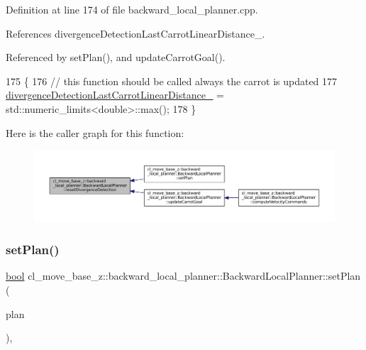 Definition at line 174 of file backward\+\_\+local\+\_\+planner.\+cpp.



References divergence\+Detection\+Last\+Carrot\+Linear\+Distance\+\_\+.



Referenced by set\+Plan(), and update\+Carrot\+Goal().


\begin{DoxyCode}
175         \{
176             \textcolor{comment}{// this function should be called always the carrot is updated}
177             \hyperlink{classcl__move__base__z_1_1backward__local__planner_1_1BackwardLocalPlanner_a3187b3b0c9a640133556efd056f2e736}{divergenceDetectionLastCarrotLinearDistance\_} = 
      std::numeric\_limits<double>::max();
178         \}
\end{DoxyCode}
Here is the caller graph for this function\+:
\nopagebreak
\begin{figure}[H]
\begin{center}
\leavevmode
\includegraphics[width=350pt]{classcl__move__base__z_1_1backward__local__planner_1_1BackwardLocalPlanner_a35832ebefc43e5977e1222389244c8d3_icgraph}
\end{center}
\end{figure}
\mbox{\label{classcl__move__base__z_1_1backward__local__planner_1_1BackwardLocalPlanner_ab11a0eec45f24b5a5a3987a50427eed4}} 
\subsubsection{\texorpdfstring{set\+Plan()}{setPlan()}}
{\footnotesize\ttfamily \hyperlink{classbool}{bool} cl\+\_\+move\+\_\+base\+\_\+z\+::backward\+\_\+local\+\_\+planner\+::\+Backward\+Local\+Planner\+::set\+Plan (\begin{DoxyParamCaption}\item[{const std\+::vector$<$ geometry\+\_\+msgs\+::\+Pose\+Stamped $>$ \&}]{plan }\end{DoxyParamCaption})\hspace{0.3cm}{\ttfamily [override]}, {\ttfamily [virtual]}}



